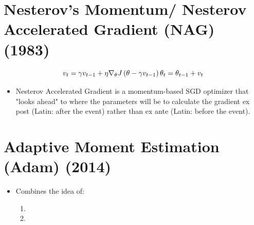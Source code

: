 \section{Nesterov’s Momentum/ Nesterov Accelerated Gradient (NAG) (1983) \cite{paperswithcode/method/nesterov-accelerated-gradient}}\label{Nesterov’s Momentum/ Nesterov Accelerated Gradient (NAG)}

\[
    v_{t} = \gamma{v}_{t-1} + \eta\nabla_{\theta}J\left(\theta-\gamma{v_{t-1}}\right)
    \hfill
    \theta_{t} = \theta_{t-1} + v_{t}
\]

\begin{itemize}
    \item Nesterov Accelerated Gradient is a momentum-based SGD optimizer that "looks ahead" to where the parameters will be to calculate the gradient ex post (Latin: after the event) rather than ex ante (Latin: before the event).

    
\end{itemize}




\section{Adaptive Moment Estimation (Adam) (2014) \cite{arxiv-1412.6980-adam}}\label{Adaptive Moment Estimation (Adam)}

\begin{itemize}
    \item Combines the idea of:
    \begin{enumerate}
        \item {}
        \item {}
    \end{enumerate}
\end{itemize}

